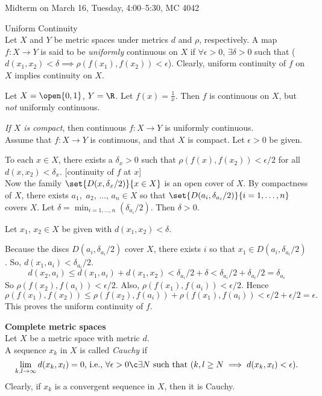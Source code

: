 Midterm on March 16, Tuesday, 4:00--5:30, MC 4042

\textbf{} Uniform Continuity \\
Let $X$ and $Y$ be metric spaces under metrics $d$ and $\rho$, respectively.  A map $f\colon X\to Y$ is said to be \emph{uniformly} continuous on $X$ if $\forall\epsilon>0$, $\exists\delta>0$ such that ($d(x_1,x_2)<\delta\implies\rho(f(x_1),f(x_2))<\epsilon$).  Clearly, uniform continuity of $f$ on $X$ implies continuity on $X$.

\eg Let $X=\open{0,1}$, $Y=\R$.  Let $f(x)=\frac{1}{x}$.  Then $f$ is continuous on $X$, but \emph{not} uniformly continuous.

\prop\emph{If\/ $X$ is compact}, then continuous $f\colon X\to Y$ is uniformly continuous. \\
\pf Assume that $f\colon X\to Y$ is continuous, and that $X$ is compact.  Let $\epsilon>0$ be given.

To each $x\in X$, there exists a $\delta_x>0$ such that $\rho(f(x),f(x_2))<\epsilon/2$ for all $d(x,x_2)<\delta_x$. [continuity of $f$ at $x$] \\
Now the family $\set{D(x,\delta_x/2)}{x\in X}$ is an open cover of $X$.  By compactness of $X$, there exists $a_1$,~$a_2$, $\dotsc$, $a_n\in X$ so that $\set{D(a_i,\delta_{a_i}/2)}{i=1,\dotsc,n}$ covers $X$.  Let $\delta=\min_{i=1,\dotsc,n}(\delta_{a_i}/2)$.  Then $\delta>0$.

Let $x_1$, $x_2\in X$ be given with $d(x_1,x_2)<\delta$.

Because the discs $D(a_i,\delta_{a_i}/2)$ cover $X$, there exists $i$ so that $x_1\in D(a_i,\delta_{a_i}/2)$.  So, $d(x_1,a_i)<\delta_{a_i}/2$.
\[ d(x_2,a_i) \leq d(x_1,a_i) + d(x_1,x_2) < \delta_{a_i}/2 + \delta < \delta_{a_i}/2 + \delta_{a_i}/2 = \delta_{a_i} \]
So $\rho(f(x_2),f(a_i))<\epsilon/2$.  Also, $\rho(f(x_1),f(a_i))<\epsilon/2$.  Hence
\[ \rho(f(x_1),f(x_2)) \leq \rho(f(x_2),f(a_i)) + \rho(f(x_1),f(a_i)) < \epsilon/2 + \epsilon/2 = \epsilon . \]
This proves the uniform continuity of $f$.

\textbf{Complete metric spaces} \\
 Let $X$ be a metric space with metric $d$. \\
A sequence $x_k$ in $X$ is called \emph{Cauchy} if
\[ \lim_{k,l\to\infty}d(x_k,x_l)=0 \text{, i.e., } \forall\epsilon>0\c\exists N\text{ such that }(k,l\geq N \implies d(x_k,x_l)<\epsilon) . \]
Clearly, if $x_k$ is a convergent sequence in $X$, then it is Cauchy.

